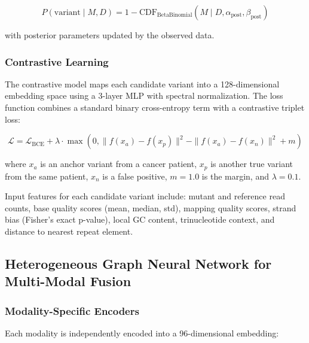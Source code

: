 \documentclass[10pt,a4paper]{article}
\begin{document}
\begin{equation}
P(\text{variant} \mid M, D) = 1 - \text{CDF}_{\text{BetaBinomial}}(M \mid D, \alpha_{\text{post}}, \beta_{\text{post}})
\end{equation}

with posterior parameters updated by the observed data.

\subsubsection{Contrastive Learning}

The contrastive model maps each candidate variant into a 128-dimensional embedding space using a 3-layer MLP with spectral normalization. The loss function combines a standard binary cross-entropy term with a contrastive triplet loss:

\begin{equation}
\mathcal{L} = \mathcal{L}_{\text{BCE}} + \lambda \cdot \max(0, \|f(x_a) - f(x_p)\|^2 - \|f(x_a) - f(x_n)\|^2 + m)
\end{equation}

where $x_a$ is an anchor variant from a cancer patient, $x_p$ is another true variant from the same patient, $x_n$ is a false positive, $m = 1.0$ is the margin, and $\lambda = 0.1$.

Input features for each candidate variant include: mutant and reference read counts, base quality scores (mean, median, std), mapping quality scores, strand bias (Fisher's exact p-value), local GC content, trinucleotide context, and distance to nearest repeat element.

\subsection{Heterogeneous Graph Neural Network for Multi-Modal Fusion}

\subsubsection{Modality-Specific Encoders}

Each modality is independently encoded into a 96-dimensional embedding:
\end{document}
